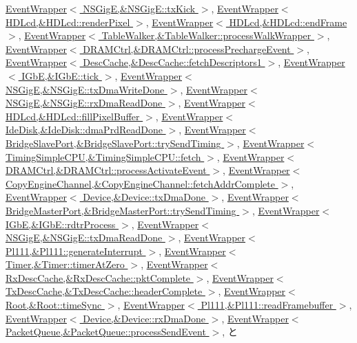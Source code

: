 \hyperlink{classEventWrapper_a6490f765a824ced1cc94979609fe7e07}{EventWrapper$<$ NSGigE,\&NSGigE::txKick $>$}, \hyperlink{classEventWrapper_a6490f765a824ced1cc94979609fe7e07}{EventWrapper$<$ HDLcd,\&HDLcd::renderPixel $>$}, \hyperlink{classEventWrapper_a6490f765a824ced1cc94979609fe7e07}{EventWrapper$<$ HDLcd,\&HDLcd::endFrame $>$}, \hyperlink{classEventWrapper_a6490f765a824ced1cc94979609fe7e07}{EventWrapper$<$ TableWalker,\&TableWalker::processWalkWrapper $>$}, \hyperlink{classEventWrapper_a6490f765a824ced1cc94979609fe7e07}{EventWrapper$<$ DRAMCtrl,\&DRAMCtrl::processPrechargeEvent $>$}, \hyperlink{classEventWrapper_a6490f765a824ced1cc94979609fe7e07}{EventWrapper$<$ DescCache,\&DescCache::fetchDescriptors1 $>$}, \hyperlink{classEventWrapper_a6490f765a824ced1cc94979609fe7e07}{EventWrapper$<$ IGbE,\&IGbE::tick $>$}, \hyperlink{classEventWrapper_a6490f765a824ced1cc94979609fe7e07}{EventWrapper$<$ NSGigE,\&NSGigE::txDmaWriteDone $>$}, \hyperlink{classEventWrapper_a6490f765a824ced1cc94979609fe7e07}{EventWrapper$<$ NSGigE,\&NSGigE::rxDmaReadDone $>$}, \hyperlink{classEventWrapper_a6490f765a824ced1cc94979609fe7e07}{EventWrapper$<$ HDLcd,\&HDLcd::fillPixelBuffer $>$}, \hyperlink{classEventWrapper_a6490f765a824ced1cc94979609fe7e07}{EventWrapper$<$ IdeDisk,\&IdeDisk::dmaPrdReadDone $>$}, \hyperlink{classEventWrapper_a6490f765a824ced1cc94979609fe7e07}{EventWrapper$<$ BridgeSlavePort,\&BridgeSlavePort::trySendTiming $>$}, \hyperlink{classEventWrapper_a6490f765a824ced1cc94979609fe7e07}{EventWrapper$<$ TimingSimpleCPU,\&TimingSimpleCPU::fetch $>$}, \hyperlink{classEventWrapper_a6490f765a824ced1cc94979609fe7e07}{EventWrapper$<$ DRAMCtrl,\&DRAMCtrl::processActivateEvent $>$}, \hyperlink{classEventWrapper_a6490f765a824ced1cc94979609fe7e07}{EventWrapper$<$ CopyEngineChannel,\&CopyEngineChannel::fetchAddrComplete $>$}, \hyperlink{classEventWrapper_a6490f765a824ced1cc94979609fe7e07}{EventWrapper$<$ Device,\&Device::txDmaDone $>$}, \hyperlink{classEventWrapper_a6490f765a824ced1cc94979609fe7e07}{EventWrapper$<$ BridgeMasterPort,\&BridgeMasterPort::trySendTiming $>$}, \hyperlink{classEventWrapper_a6490f765a824ced1cc94979609fe7e07}{EventWrapper$<$ IGbE,\&IGbE::rdtrProcess $>$}, \hyperlink{classEventWrapper_a6490f765a824ced1cc94979609fe7e07}{EventWrapper$<$ NSGigE,\&NSGigE::txDmaReadDone $>$}, \hyperlink{classEventWrapper_a6490f765a824ced1cc94979609fe7e07}{EventWrapper$<$ Pl111,\&Pl111::generateInterrupt $>$}, \hyperlink{classEventWrapper_a6490f765a824ced1cc94979609fe7e07}{EventWrapper$<$ Timer,\&Timer::timerAtZero $>$}, \hyperlink{classEventWrapper_a6490f765a824ced1cc94979609fe7e07}{EventWrapper$<$ RxDescCache,\&RxDescCache::pktComplete $>$}, \hyperlink{classEventWrapper_a6490f765a824ced1cc94979609fe7e07}{EventWrapper$<$ TxDescCache,\&TxDescCache::headerComplete $>$}, \hyperlink{classEventWrapper_a6490f765a824ced1cc94979609fe7e07}{EventWrapper$<$ Root,\&Root::timeSync $>$}, \hyperlink{classEventWrapper_a6490f765a824ced1cc94979609fe7e07}{EventWrapper$<$ Pl111,\&Pl111::readFramebuffer $>$}, \hyperlink{classEventWrapper_a6490f765a824ced1cc94979609fe7e07}{EventWrapper$<$ Device,\&Device::rxDmaDone $>$}, \hyperlink{classEventWrapper_a6490f765a824ced1cc94979609fe7e07}{EventWrapper$<$ PacketQueue,\&PacketQueue::processSendEvent $>$}, と 